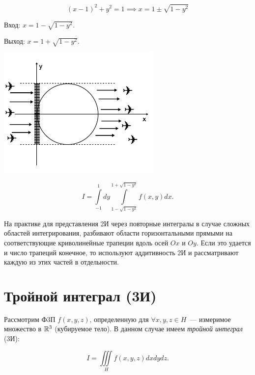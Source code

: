 \documentclass[../../main.tex]{subfiles}
\begin{document}
\begin{exmp}
\begin{enumerate}
		\[ \left( x - 1 \right)^2 + y^2 = 1 \implies x = 1 \pm \sqrt{1 - y^2} \]
		
		Вход: $ x = 1 - \sqrt{1 - y^2 }$.
		
		Выход: $ x = 1 + \sqrt{1 - y^2 } $.
		
		\begin{center}
			\includegraphics[width=0.6\textwidth]{lec13_circle_case2.png}
		\end{center}
		
		\[ I = \int\limits_{-1}^1 dy \int\limits_{1 - \sqrt{1 - y^2}} ^ 
		{1 + \sqrt{1 - y^2}} f \left( x, y\right) dx. \]
	\end{enumerate}
\end{exmp}

На практике для представления 2И через повторные интегралы
в случае
сложных областей интегрирования, разбивают области горизонтальными
прямыми на соответствующие криволинейные трапеции вдоль осей $Ox$ и $Oy$.
Если это удается
и число трапеций конечное, то используют аддитивность 2И и рассматривают
каждую из этих частей в отдельности.

\section{Тройной интеграл (3И)}

Рассмотрим Ф3П $ f \left( x, y, z \right)$, определенную для 
$\forall x, y, z \in H $~--- измеримое множество в $ \mathbb{R}^3 $
(кубируемое тело). В данном случае имеем \emph{тройной интеграл} (3И):

\begin{equation}
\label{lec_13, num_23}
I = \iiint\limits_{H} f \left( x, y, z \right) dx dy dz.
\end{equation}
\end{document}
